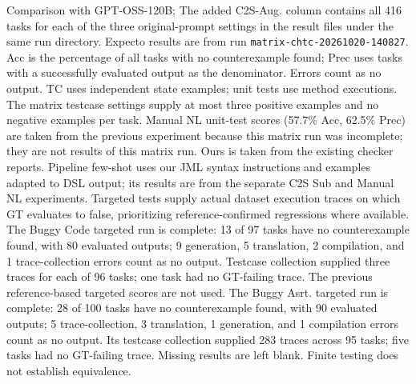 \begin{table}[t]
\caption{Comparison with GPT-OSS-120B; The added C2S-Aug. column contains all 416 tasks for each of the three original-prompt settings in the result files under the same run directory. Expecto results are from run \texttt{matrix-chtc-20261020-140827}. Acc is the percentage of all tasks with no counterexample found; Prec uses tasks with a successfully evaluated output as the denominator. Errors count as no output. TC uses independent state examples; unit tests use method executions. The matrix testcase settings supply at most three positive examples and no negative examples per task. Manual NL unit-test scores (57.7\% Acc, 62.5\% Prec) are taken from the previous experiment because this matrix run was incomplete; they are not results of this matrix run. Ours is taken from the existing checker reports. Pipeline few-shot uses our JML syntax instructions and examples adapted to DSL output; its results are from the separate C2S Sub and Manual NL experiments. Targeted tests supply actual dataset execution traces on which GT evaluates to false, prioritizing reference-confirmed regressions where available. The Buggy Code targeted run is complete: 13 of 97 tasks have no counterexample found, with 80 evaluated outputs; 9 generation, 5 translation, 2 compilation, and 1 trace-collection errors count as no output. Testcase collection supplied three traces for each of 96 tasks; one task had no GT-failing trace. The previous reference-based targeted scores are not used. The Buggy Asrt. targeted run is complete: 28 of 100 tasks have no counterexample found, with 90 evaluated outputs; 5 trace-collection, 3 translation, 1 generation, and 1 compilation errors count as no output. Its testcase collection supplied 283 traces across 95 tasks; five tasks had no GT-failing trace. Missing results are left blank. Finite testing does not establish equivalence.}
\label{tab:expecto-matrix-20261020}
\end{table}
